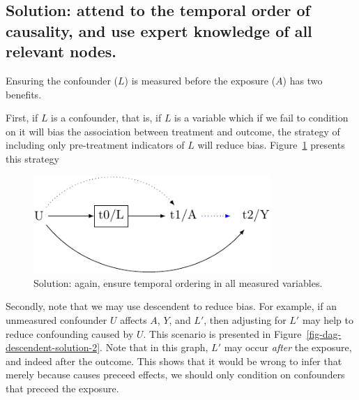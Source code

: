 \documentclass[
  singlecolumn]{report}
\begin{document}
\hypertarget{solution-attend-to-the-temporal-order-of-causality-and-use-expert-knowledge-of-all-relevant-nodes.}{%
\subsection{Solution: attend to the temporal order of causality, and use
expert knowledge of all relevant
nodes.}\label{solution-attend-to-the-temporal-order-of-causality-and-use-expert-knowledge-of-all-relevant-nodes.}}

Ensuring the confounder (\(L\)) is measured before the exposure (\(A\))
has two benefits.

First, if \(L\) is a confounder, that is, if \(L\) is a variable which
if we fail to condition on it will bias the association between
treatment and outcome, the strategy of including only pre-treatment
indicators of \(L\) will reduce bias.
Figure~\ref{fig-dag-descendent-solution} presents this strategy

\begin{figure}

{\centering \includegraphics[width=0.8\textwidth,height=\textheight]{causal-dags_files/figure-pdf/fig-dag-descendent-solution-1.pdf}

}

\caption{\label{fig-dag-descendent-solution}Solution: again, ensure
temporal ordering in all measured variables.}

\end{figure}

Secondly, note that we may use descendent to reduce bias. For example,
if an unmeasured confounder \(U\) affects \(A\), \(Y\), and \(L\prime\),
then adjusting for \(L\prime\) may help to reduce confounding caused by
\(U\). This scenario is presented in
Figure~\ref{fig-dag-descendent-solution-2}. Note that in this graph,
\(L\prime\) may occur \emph{after} the exposure, and indeed after the
outcome. This shows that it would be wrong to infer that merely because
causes preceed effects, we should only condition on confounders that
preceed the exposure.
\end{document}
